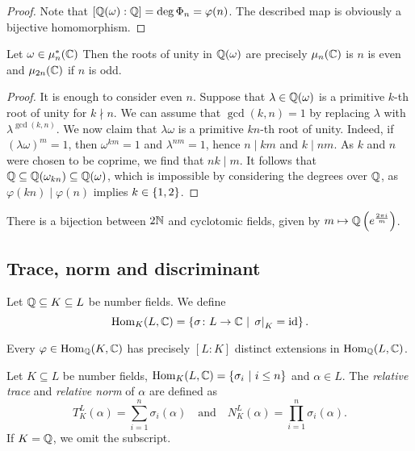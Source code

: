 \begin{proof}
Note that $[\mathbb{Q}(\omega) : \mathbb{Q}] = \deg \Phi_n = \varphi(n)$. The
described map is obviously a bijective homomorphism.
\end{proof}

\begin{posledica}
\label{alg_int:cor:root_mult}
Let $\omega \in \mu_n^*(\mathbb{C})$ Then the roots of unity in
$\mathbb{Q}(\omega)$ are precisely $\mu_n(\mathbb{C})$ is $n$ is even and
$\mu_{2n}(\mathbb{C})$ if $n$ is odd.
\end{posledica}

\begin{proof}
It is enough to consider even $n$. Suppose that
$\lambda \in \mathbb{Q}(\omega)$ is a primitive $k$-th root of unity for
$k \nmid n$. We can assume that $\gcd(k, n) = 1$ by replacing
$\lambda$ with $\lambda^{\gcd(k,n)}$. We now claim that
$\lambda \omega$ is a primitive $kn$-th root of unity. Indeed, if
$(\lambda \omega)^m = 1$, then $\omega^{km} = 1$ and
$\lambda^{nm} = 1$, hence $n \mid km$ and $k \mid nm$. As $k$ and
$n$ were chosen to be coprime, we find that $nk \mid m$. It follows
that $\mathbb{Q} \subseteq \mathbb{Q}(\omega_{kn}) \subseteq \mathbb{Q}(\omega)$, which is
impossible by considering the degrees over $\mathbb{Q}$, as
$\varphi(kn) \mid \varphi(n)$ implies $k \in \left\{1, 2\right\}$.
\end{proof}

\begin{posledica}
There is a bijection between $2 \mathbb{N}$ and cyclotomic fields, given by
$m \mapsto \mathbb{Q} \left(e^{\frac{2 \pi i}{m}}\right)$.
\end{posledica}

\newpage

\subsection{Trace, norm and discriminant}

\begin{definicija}
Let $\mathbb{Q} \subseteq K \subseteq L$ be number fields. We define
\[
\operatorname{Hom}_K(L, \mathbb{C}) =
\left\{\sigma \colon L \to \mathbb{C}~\middle\vert~\left. \sigma\right|_{K}^{} = \operatorname{id}\right\}.
\]
\end{definicija}

\begin{opomba}
Every $\varphi \in \operatorname{Hom}_{\mathbb{Q}}(K, \mathbb{C})$ has precisely $[L : K]$ distinct
extensions in $\operatorname{Hom}_{\mathbb{Q}}(L, \mathbb{C})$.
\end{opomba}

\begin{definicija}
Let $K \subseteq L$ be number fields,
$\operatorname{Hom}_K(L, \mathbb{C}) = \left\{\sigma_i~\middle\vert~i \leq n\right\}$ and $\alpha \in L$. The
\emph{relative trace} and
\emph{relative norm} of $\alpha$ are defined as
\[
T_K^L(\alpha) = \sum_{i=1}^n \sigma_i(\alpha)
\quad \text{and} \quad
N_K^L(\alpha) = \prod_{i=1}^n \sigma_i(\alpha).
\]
If $K = \mathbb{Q}$, we omit the subscript.
\end{definicija}

